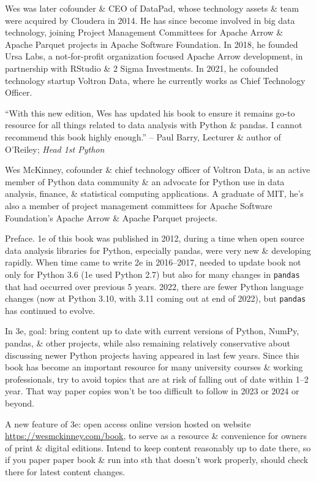 \documentclass{article}
\begin{document}
{\sc Wes} was later cofounder \& CEO of DataPad, whose technology assets \& team were acquired by Cloudera in 2014. He has since become involved in big data technology, joining Project Management Committees for Apache Arrow \& Apache Parquet projects in Apache Software Foundation. In 2018, he founded Ursa Labs, a not-for-profit organization focused Apache Arrow development, in partnership with RStudio \& 2 Sigma Investments. In 2021, he cofounded technology startup Voltron Data, where he currently works as Chief Technology Officer.

``With this new edition, {\sc Wes} has updated his book to ensure it remains go-to resource for all things related to data analysis with Python \& pandas. I cannot recommend this book highly enough.'' -- {\sc Paul Barry}, Lecturer \& author of O'Reiley; {\it Head 1st Python}

{\sc Wes McKinney}, cofounder \& chief technology officer of Voltron Data, is an active member of Python data community \& an advocate for Python use in data analysis, finance, \& statistical computing applications. A graduate of MIT, he's also a member of project management committees for Apache Software Foundation's Apache Arrow \& Apache Parquet projects.

{\sf Preface.} 1e of this book was published in 2012, during a time when open source data analysis libraries for Python, especially pandas, were very new \& developing rapidly. When time came to write 2e in 2016--2017, needed to update book not only for Python 3.6 (1e used Python 2.7) but also for many changes in {\tt pandas} that had occurred over previous 5 years. 2022, there are fewer Python language changes (now at Python 3.10, with 3.11 coming out at end of 2022), but {\tt pandas} has continued to evolve.

In 3e, goal: bring content up to date with current versions of Python, NumPy, pandas, \& other projects, while also remaining relatively conservative about discussing newer Python projects having appeared in last few years. Since this book has become an important resource for many university courses \& working professionals, try to avoid topics that are at risk of falling out of date within 1--2 year. That way paper copies won't be too difficult to follow in 2023 or 2024 or beyond.

A new feature of 3e: open access online version hosted on website \url{https://wesmckinney.com/book}, to serve as a resource \& convenience for owners of print \& digital editions. Intend to keep content reasonably up to date there, so if you paper paper book \& run into sth that doesn't work properly, should check there for latest content changes.
\end{document}
